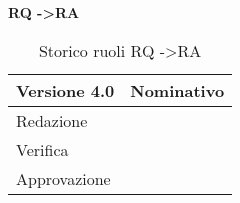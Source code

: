 \newpage
\textbf{RQ -\textgreater RA}
\begin{table}[h]
\begin{center}
\begin{tabular}{p{} p{}}
\toprule
\textbf{Versione 4.0}	&	\textbf{Nominativo}\\
\midrule
\midrule
Redazione	&	\DC \\
\midrule
Verifica &	\EZ	\\
\midrule
Approvazione	&	\MB	\\
\bottomrule
\end{tabular}
\caption{Storico ruoli RQ -\textgreater RA}
\label{tabVers1}
\end{center}
\end{table}

